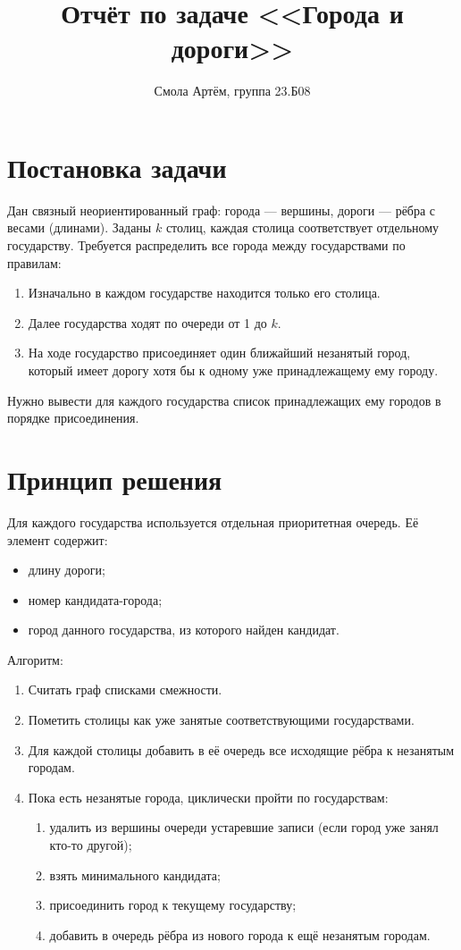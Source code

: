 \documentclass[12pt,a4paper]{article}
\title{Отчёт по задаче <<Города и дороги>>}
\author{Смола Артём, группа 23.Б08}
\date{}
\begin{document}
\maketitle

\section{Постановка задачи}
Дан связный неориентированный граф: города --- вершины, дороги --- рёбра с весами (длинами).
Заданы $k$ столиц, каждая столица соответствует отдельному государству.
Требуется распределить все города между государствами по правилам:
\begin{enumerate}
    \item Изначально в каждом государстве находится только его столица.
    \item Далее государства ходят по очереди от 1 до $k$.
    \item На ходе государство присоединяет один ближайший незанятый город, который имеет дорогу хотя бы к одному уже принадлежащему ему городу.
\end{enumerate}
Нужно вывести для каждого государства список принадлежащих ему городов в порядке присоединения.

\section{Принцип решения}
Для каждого государства используется отдельная приоритетная очередь.
Её элемент содержит:
\begin{itemize}
    \item длину дороги;
    \item номер кандидата-города;
    \item город данного государства, из которого найден кандидат.
\end{itemize}

Алгоритм:
\begin{enumerate}
    \item Считать граф списками смежности.
    \item Пометить столицы как уже занятые соответствующими государствами.
    \item Для каждой столицы добавить в её очередь все исходящие рёбра к незанятым городам.
    \item Пока есть незанятые города, циклически пройти по государствам:
    \begin{enumerate}
        \item удалить из вершины очереди устаревшие записи (если город уже занял кто-то другой);
        \item взять минимального кандидата;
        \item присоединить город к текущему государству;
        \item добавить в очередь рёбра из нового города к ещё незанятым городам.
    \end{enumerate}
\end{enumerate}
\end{document}

